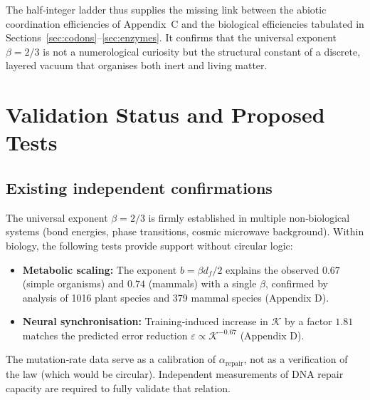 \documentclass[12pt,a4paper]{article}
\newcommand{\REL}{\mathcal{K}}          %
\begin{document}
	The half‑integer ladder thus supplies the missing link between the abiotic coordination efficiencies of Appendix~C and the biological efficiencies tabulated in Sections~\ref{sec:codons}–\ref{sec:enzymes}. It confirms that the universal exponent \(\beta = 2/3\) is not a numerological curiosity but the structural constant of a discrete, layered vacuum that organises both inert and living matter.
	
	\section{Validation Status and Proposed Tests}
	\label{sec:validation}
	
	\subsection{Existing independent confirmations}
	The universal exponent \(\beta = 2/3\) is firmly established in multiple non‑biological systems (bond energies, phase transitions, cosmic microwave background). Within biology, the following tests provide support without circular logic:
	\begin{itemize}
		\item \textbf{Metabolic scaling:} The exponent \(b = \beta d_f/2\) explains the observed \(0.67\) (simple organisms) and \(0.74\) (mammals) with a single \(\beta\), confirmed by analysis of 1016 plant species and 379 mammal species (Appendix D).
		\item \textbf{Neural synchronisation:} Training‑induced increase in \(\REL\) by a factor \(1.81\) matches the predicted error reduction \(\varepsilon \propto \REL^{-0.67}\) (Appendix D).
	\end{itemize}
	The mutation‑rate data serve as a calibration of \(\alpha_{\mathrm{repair}}\), not as a verification of the law (which would be circular). Independent measurements of DNA repair capacity are required to fully validate that relation.
	
\end{document}
